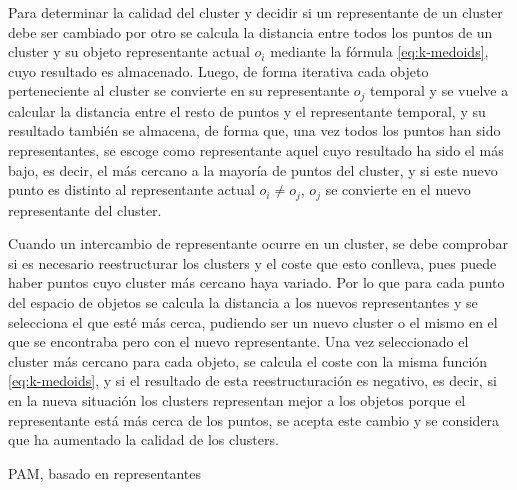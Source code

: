\documentclass[3p,twocolumn]{elsarticle}
\begin{document}
Para determinar la calidad del cluster y decidir si un representante de un cluster debe ser cambiado por otro se calcula la distancia entre todos los puntos de un cluster y su objeto representante actual $o_i$ mediante la fórmula \ref{eq:k-medoids}, cuyo resultado es almacenado. Luego, de forma iterativa cada objeto perteneciente al cluster se convierte en su representante $o_j$ temporal y se vuelve a calcular la distancia entre el resto de puntos y el representante temporal, y su resultado también se almacena, de forma que, una vez todos los puntos han sido representantes, se escoge como representante aquel cuyo resultado ha sido el más bajo, es decir, el más cercano a la mayoría de puntos del cluster, y si este nuevo punto es distinto al representante actual $o_i \neq o_j$, $o_j$ se convierte en el nuevo representante del cluster. 

Cuando un intercambio de representante ocurre en un cluster, se debe comprobar si es necesario reestructurar los clusters y el coste que esto conlleva, pues puede haber puntos cuyo cluster más cercano haya variado. Por lo que para cada punto del espacio de objetos se calcula la distancia a los nuevos representantes y se selecciona el que esté más cerca, pudiendo ser un nuevo cluster o el mismo en el que se encontraba pero con el nuevo representante. Una vez seleccionado el cluster más cercano para cada objeto, se calcula el coste con la misma función \ref{eq:k-medoids}, y si el resultado de esta reestructuración es negativo, es decir, si en la nueva situación los clusters representan mejor a los objetos porque el representante está más cerca de los puntos, se acepta este cambio y se considera que ha aumentado la calidad de los clusters.

\begin{algorithm}[ht]
\SetAlgoLined
  \LinesNumbered
  \DontPrintSemicolon
  \caption{PAM, basado en representantes}
  \label{alg:Algoritmo PAM}
\end{algorithm}
\end{document}
